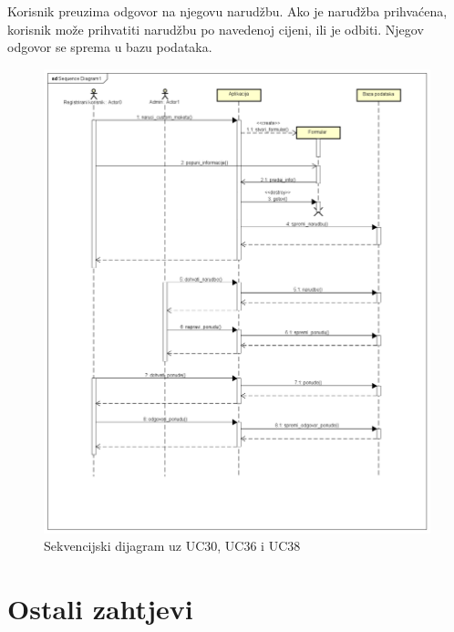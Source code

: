 				Korisnik preuzima odgovor na njegovu narudžbu. Ako je naruđžba prihvaćena, korisnik može prihvatiti narudžbu po navedenoj cijeni, ili je odbiti. Njegov odgovor se sprema u bazu podataka. 
				
				\begin{figure} [H]
					\centering
					\includegraphics[width=1\linewidth]{"slike/sekv_dijagram_final"}
					\caption{Sekvencijski dijagram uz UC30, UC36 i UC38}
					\label{fig:seqdiag_01}
				\end{figure}
				\pagebreak
			
				
				
				\eject
	
		\section{Ostali zahtjevi}
		
